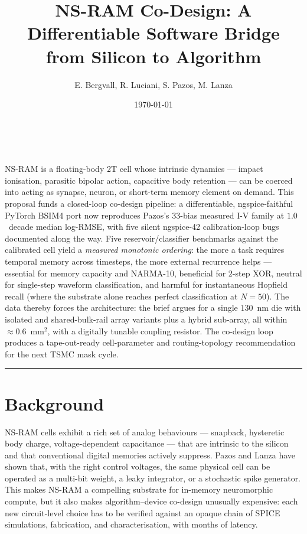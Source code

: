 \documentclass[fontsize=10pt]{article}
\title{
\Large NS-RAM Co-Design: A Differentiable Software Bridge from Silicon to Algorithm \\
[10pt]
}
\date{\today}
\author{E. Bergvall, R. Luciani, S. Pazos, M. Lanza}
\makeatletter
\renewenvironment{abstract}
 {\small
  \begin{center}
  \bfseries \abstractname\vspace{-.5em}\vspace{0pt}
  \end{center}
  \list{}{%
    \setlength{\leftmargin}{0mm}
    \setlength{\rightmargin}{\leftmargin}%
  }
  \item\relax}
 {\endlist}
\renewcommand{\maketitle}{\bgroup\setlength{\parindent}{0pt}
\begin{flushleft}
  \textbf{\@title}
  \@author \\
  \@date
\end{flushleft}\egroup
}
\makeatother
\begin{document}
 \maketitle

\begin{abstract}
NS-RAM is a floating-body 2T cell whose intrinsic dynamics --- impact ionisation,
parasitic bipolar action, capacitive body retention --- can be coerced into acting
as synapse, neuron, or short-term memory element on demand. This proposal funds a
closed-loop co-design pipeline: a differentiable, ngspice-faithful PyTorch BSIM4
port now reproduces Pazos's $33$-bias measured I-V family at $1.0$~decade median
log-RMSE, with five silent ngspice-42 calibration-loop bugs documented along the
way. Five reservoir/classifier benchmarks against the calibrated cell yield a
\emph{measured monotonic ordering}: the more a task requires temporal memory across
timesteps, the more external recurrence helps --- essential for memory capacity and
NARMA-10, beneficial for $2$-step XOR, neutral for single-step waveform
classification, and harmful for instantaneous Hopfield recall (where the substrate
alone reaches perfect classification at $N=50$). The data thereby forces the
architecture: the brief argues for a single $130$~nm die with isolated and
shared-bulk-rail array variants plus a hybrid sub-array, all within $\approx 0.6$~mm$^2$,
with a digitally tunable coupling resistor. The co-design loop produces a
tape-out-ready cell-parameter and routing-topology recommendation for the next
TSMC mask cycle.
\end{abstract}

\rule{\linewidth}{0.5pt}


\section{Background}
NS-RAM cells exhibit a rich set of analog behaviours --- snapback, hysteretic body charge,
voltage-dependent capacitance --- that are intrinsic to the silicon and that conventional
digital memories actively suppress. Pazos and Lanza have shown that, with the right control
voltages, the same physical cell can be operated as a multi-bit weight, a leaky integrator,
or a stochastic spike generator. This makes NS-RAM a compelling substrate for in-memory
neuromorphic compute, but it also makes algorithm--device co-design unusually expensive:
each new circuit-level choice has to be verified against an opaque chain of SPICE
simulations, fabrication, and characterisation, with months of latency.
\end{document}
